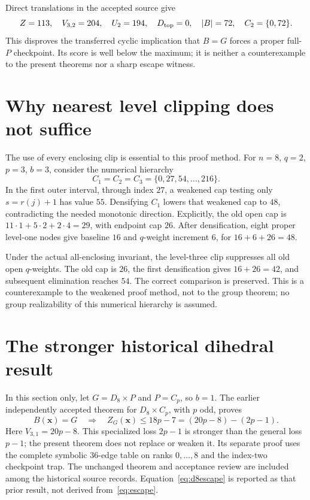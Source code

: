 \documentclass[11pt,letterpaper]{article}
\theoremstyle{definition}\newtheorem{definition}{Definition}
\begin{document}
Direct translations in the accepted source give
\begin{equation}
Z=113,\quad V_{3,2}=204,\quad U_2=194,\quad D_{\rm top}=0,
\quad |B|=72,\quad C_2=\{0,72\}.\label{eq:switchvalues}
\end{equation}
This disproves the transferred cyclic implication that $B=G$ forces a proper full-$P$ checkpoint. Its score is well below the maximum; it is neither a counterexample to the present theorems nor a sharp escape witness.

\section{Why nearest level clipping does not suffice}\label{sec:diagnostic}
The use of every enclosing clip is essential to this proof method. For $n=8$, $q=2$, $p=3$, $b=3$, consider the numerical hierarchy
\[
C_1=C_2=C_3=\{0,27,54,\ldots,216\}.
\]
In the first outer interval, through index $27$, a weakened cap testing only $s=r(j)+1$ has value $55$. Densifying $C_1$ lowers that weakened cap to $48$, contradicting the needed monotonic direction. Explicitly, the old open cap is $11\cdot1+5\cdot2+2\cdot4=29$, with endpoint cap $26$. After densification, eight proper level-one nodes give baseline $16$ and $q$-weight increment $6$, for $16+6+26=48$.

Under the actual all-enclosing invariant, the level-three clip suppresses all old open $q$-weights. The old cap is $26$, the first densification gives $16+26=42$, and subsequent elimination reaches $54$. The correct comparison is preserved. This is a counterexample to the weakened proof method, not to the group theorem; no group realizability of this numerical hierarchy is assumed.

\section{The stronger historical dihedral result}\label{sec:d8}
In this section only, let $G=D_8\times P$ and $P=C_p$, so $b=1$. The earlier independently accepted theorem for $D_8\times C_p$, with $p$ odd, proves
\begin{equation}
B(\mathbf{x})=G\quad\Longrightarrow\quad
Z_G(\mathbf{x})\le18p-7=(20p-8)-(2p-1).\label{eq:d8escape}
\end{equation}
Here $V_{3,1}=20p-8$. This specialized loss $2p-1$ is stronger than the general loss $p-1$; the present theorem does not replace or weaken it. Its separate proof uses the complete symbolic 36-edge table on ranks $0,\ldots,8$ and the index-two checkpoint trap. The unchanged theorem and acceptance review are included among the historical source records. Equation~\eqref{eq:d8escape} is reported as that prior result, not derived from~\eqref{eq:escape}.
\end{document}
